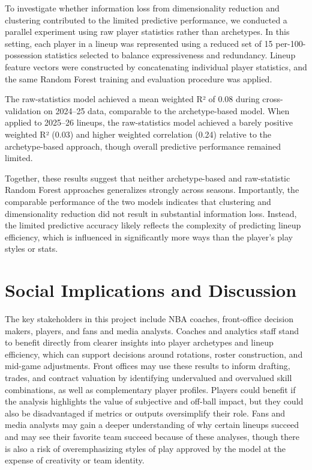 \documentclass{article}
\begin{document}
To investigate whether information loss from dimensionality reduction and clustering contributed 
to the limited predictive performance, we conducted a parallel experiment using raw player 
statistics rather than archetypes. In this setting, each player in a lineup was represented 
using a reduced set of 15 per-100-possession statistics selected to balance expressiveness and 
redundancy. Lineup feature vectors were constructed by concatenating individual player statistics, 
and the same Random Forest training and evaluation procedure was applied.

The raw-statistics model achieved a mean weighted R² of 0.08 during cross-validation on 2024–25 
data, comparable to the archetype-based model. When applied to 2025–26 lineups, the raw-statistics 
model achieved a barely positive weighted R² (0.03) and higher weighted correlation (0.24) 
relative to the archetype-based approach, though overall predictive performance remained limited.

Together, these results suggest that neither archetype-based and raw-statistic Random Forest 
approaches generalizes strongly across seasons. Importantly, the comparable performance of the 
two models indicates that clustering and dimensionality reduction did not result in substantial 
information loss. Instead, the limited predictive accuracy likely reflects the complexity of 
predicting lineup efficiency, which is influenced in significantly more ways than the player’s 
play styles or stats.


\section{Social Implications and Discussion}
\label{Social Implications}

The key stakeholders in this project include NBA coaches, front-office decision makers, 
players, and fans and media analysts. Coaches and analytics staff stand to benefit directly 
from clearer insights into player archetypes and lineup efficiency, which can support decisions 
around rotations, roster construction, and mid-game adjustments. Front offices may use these 
results to inform drafting, trades, and contract valuation by identifying undervalued and 
overvalued skill combinations, as well as complementary player profiles. Players could benefit 
if the analysis highlights the value of subjective and off-ball impact, but they could also be 
disadvantaged if metrics or outputs oversimplify their role. Fans and media analysts may gain 
a deeper understanding of why certain lineups succeed and may see their favorite team succeed 
because of these analyses, though there is also a risk of overemphasizing styles of play approved 
by the model at the expense of creativity or team identity.
\end{document}
